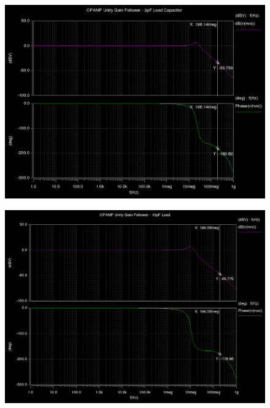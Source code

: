 \documentclass[12pt]{article}
\begin{document}
\begin{figure}[h!] 
\begin{center}
 \includegraphics[scale=0.35]{./2pf.png}
\end{center}
\end{figure}
\begin{figure}[h!] 
\begin{center}
 \includegraphics[scale=0.3]{./10p.png}
\end{center}
\end{figure}
\FloatBarrier
\end{document}
